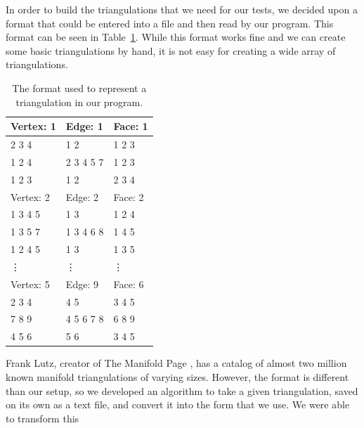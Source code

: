 \documentclass[12pt]{article}
\begin{document}
 In order to build the triangulations that we need for our tests, we decided upon a format that could be entered into a file and then read by our program. This format can be seen in Table~\ref{tab:format}. While this format works fine and we can create some basic triangulations by hand, it is not easy for creating a wide array of triangulations.

\begin{table}
\begin{center}
\begin{tabular}{|l|l|l|}
\hline
 Vertex: 1 &    Edge: 1 &    Face: 1 \\ \hline 

     2 3 4 &        1 2 &     1 2 3  \\

    1 2 4  & 2 3 4 5 7  &     1 2 3  \\

    1 2 3  &       1 2  &     2 3 4  \\ \hline 

 Vertex: 2 &    Edge: 2 &    Face: 2 \\ \hline

   1 3 4 5 &        1 3 &     1 2 4  \\

  1 3 5 7  & 1 3 4 6 8  &     1 4 5  \\

  1 2 4 5  &       1 3  &     1 3 5  \\ \hline 

 			\vdots & \vdots & \vdots \\ \hline 

 Vertex: 5 &    Edge: 9 &    Face: 6 \\ \hline

     2 3 4 &        4 5 &     3 4 5  \\

    7 8 9  & 4 5 6 7 8  &     6 8 9  \\

     4 5 6 &       5 6  &     3 4 5  \\
\hline
\end{tabular}
\end{center}
\caption{The format used to represent a triangulation in our program.}
\label{tab:format}
\end{table}

 Frank Lutz, creator of The Manifold Page \cite{lutzmanifold}, has a catalog of almost two million known manifold triangulations of varying sizes. However, the format is different than our setup, so we developed an algorithm to take a given triangulation, saved on its own as a text file, and convert it into the form that we use. We were able to transform this
  
\end{document}
